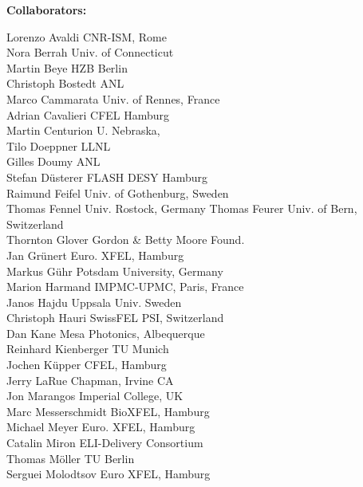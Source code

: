 \documentclass[letterpaper,oneside,11pt]{article}
\begin{document}
\vspace{1\baselineskip}
\noindent\textbf{Collaborators:}\\
\vspace{-1.5\baselineskip}
{\small
\begin{multicols}{2}
\noindent 
	Lorenzo Avaldi \hfill CNR-ISM, Rome\\ 
	Nora Berrah \hfill Univ. of Connecticut\\
	Martin Beye \hfill HZB Berlin\\
	Christoph Bostedt \hfill ANL\\
	Marco Cammarata \hfill Univ. of Rennes, France\\
	Adrian Cavalieri \hfill CFEL Hamburg\\
	Martin Centurion \hfill U. Nebraska,\\
	Tilo Doeppner \hfill LLNL\\
	Gilles Doumy \hfill ANL \\
	Stefan D\"usterer \hfill FLASH DESY Hamburg\\
	Raimund Feifel \hfill Univ. of Gothenburg, Sweden\\
	Thomas Fennel \hfill Univ. Rostock, Germany
	Thomas Feurer \hfill Univ. of Bern, Switzerland\\
	Thornton Glover \hfill Gordon \& Betty Moore Found.\\
	Jan Gr\"unert \hfill Euro. XFEL, Hamburg\\
	Markus G\"uhr \hfill Potsdam University, Germany\\
	Marion Harmand \hfill IMPMC-UPMC, Paris, France\\
	Janos Hajdu \hfill Uppsala Univ. Sweden\\
	Christoph Hauri \hfill SwissFEL PSI, Switzerland\\
	Dan Kane \hfill Mesa Photonics, Albequerque\\
	Reinhard Kienberger \hfill TU Munich\\
	Jochen K\"upper \hfill CFEL, Hamburg\\
	Jerry LaRue \hfill Chapman, Irvine CA\\
	Jon Marangos \hfill Imperial College, UK\\
	Marc Messerschmidt \hfill BioXFEL, Hamburg\\
	Michael Meyer \hfill Euro. XFEL, Hamburg\\
	Catalin Miron \hfill ELI-Delivery Consortium\\
	Thomas M\"oller \hfill TU Berlin\\
	Serguei Molodtsov \hfill Euro XFEL, Hamburg\\

\end{multicols}}
\end{document}
